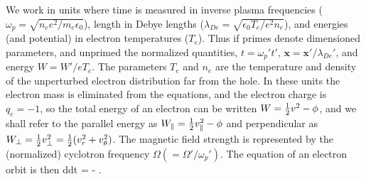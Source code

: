 \documentclass{agujournal2019}
\let\oldequation\equation
\let\oldendequation\endequation
\renewenvironment{equation}
  {\linenomathNonumbers\oldequation}
  {\oldendequation\endlinenomath}
\begin{document}
We work in units where time is measured in inverse plasma frequencies
($\omega_p=\sqrt{n_ee^2/m_e\epsilon_0}$), length in Debye lengths
($\lambda_{De}=\sqrt{\epsilon_0T_e/e^2n_e}$), and energies (and
potential) in electron temperatures ($T_e$). Thus if primes denote
dimensioned parameters, and unprimed the normalized quantities,
$t=\omega_p't'$, $\bm{x}=\bm{x}'/\lambda_{De}'$, and energy
$W=W'/eT_e$. The parameters $T_e$ and $n_e$ are the temperature and
density of the unperturbed electron distribution far from the hole.
In these units the electron mass is eliminated from the equations, and
the electron charge is $q_e=-1$, so the total energy of an electron
can be written $W={1\over2}v^2-\phi$, and we shall refer to the
parallel energy as $W_\parallel={1\over2}v_\parallel^2-\phi$ and
perpendicular as
$W_\perp = {1\over2}v_\perp^2={1\over2}(v_r^2+v_\theta^2)$. The
magnetic field strength is represented by the (normalized) cyclotron
frequency $\Omega(=\Omega'/\omega_p')$. The equation of an electron
orbit is then
\begin{equation}
  \label{eq:orbit}
  {d\over dt} = \bm\nabla \phi - \times\Omega{}.
\end{equation}
\end{document}
